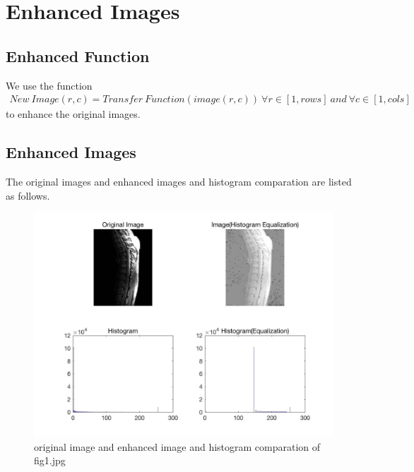 \documentclass[11pt,oneside]{book}
\begin{document}
\section{Enhanced Images}
\subsection{Enhanced Function}
We use the function\\
\begin{align}
New\ Image(r,c) = Transfer\ Function(image(r,c))\ \forall r \in [1,rows]\ and\ \forall c \in [1,cols]
\end{align}
to enhance the original images. 
\subsection{Enhanced Images}
The original images and enhanced images and histogram comparation are listed as follows.
\begin{figure}[!htb]
   \centering  
   \includegraphics[width=1.0\textwidth]{images/1/image1.jpg}
   \caption{original image and enhanced image and histogram comparation of fig1.jpg}  
\end{figure}
\end{document}
